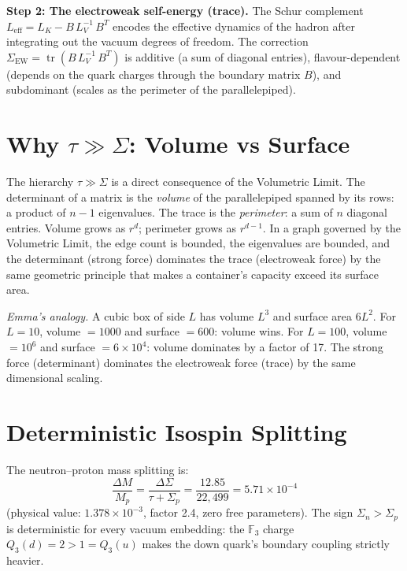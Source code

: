 \documentclass[11pt, a4paper, openany]{book}
\newcounter{thm}[chapter]
\begin{document}
\textbf{Step 2: The electroweak self-energy (trace).}
The Schur complement $L_{\mathrm{eff}} = L_K - B\,L_V^{-1}\,B^T$
encodes the effective dynamics of the hadron after integrating out the
vacuum degrees of freedom.  The correction
$\Sigma_{\mathrm{EW}} = \operatorname{tr}(B\,L_V^{-1}\,B^T)$ is
additive (a sum of diagonal entries), flavour-dependent (depends on the
quark charges through the boundary matrix $B$), and subdominant (scales
as the perimeter of the parallelepiped).

\section{Why $\tau \gg \Sigma$: Volume vs Surface}

The hierarchy $\tau \gg \Sigma$ is a direct consequence of the
Volumetric Limit.  The determinant of a matrix is the \emph{volume}
of the parallelepiped spanned by its rows: a product of $n - 1$
eigenvalues.  The trace is the \emph{perimeter}: a sum of $n$
diagonal entries.  Volume grows as $r^d$; perimeter grows as
$r^{d-1}$.  In a graph governed by the Volumetric Limit, the edge
count is bounded, the eigenvalues are bounded, and the determinant
(strong force) dominates the trace (electroweak force) by the same
geometric principle that makes a container's capacity exceed its
surface area.

\smallskip\noindent
\textit{Emma's analogy.}
A cubic box of side $L$ has volume $L^3$ and surface area $6L^2$.
For $L = 10$, volume $= 1000$ and surface $= 600$: volume wins.
For $L = 100$, volume $= 10^6$ and surface $= 6 \times 10^4$:
volume dominates by a factor of 17.  The strong force (determinant)
dominates the electroweak force (trace) by the same dimensional
scaling.

\section{Deterministic Isospin Splitting}

\begin{theorem}\label{thm:isospin}
The neutron--proton mass splitting is:
\[
  \frac{\Delta M}{M_p}
  = \frac{\Delta\Sigma}{\tau + \Sigma_p}
  = \frac{12.85}{22{,}499}
  = 5.71 \times 10^{-4}
\]
(physical value: $1.378 \times 10^{-3}$, factor 2.4, zero free
parameters). The sign $\Sigma_n > \Sigma_p$ is deterministic for
every vacuum embedding: the $\mathbb{F}_3$ charge
$Q_3(d) = 2 > 1 = Q_3(u)$ makes the down quark's boundary coupling
strictly heavier.
\end{theorem}
\end{document}
